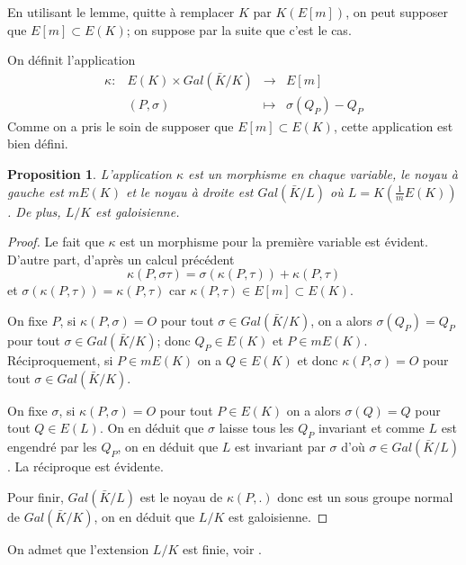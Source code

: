 \documentclass{article}
\newtheorem{proposition}{Proposition}
\begin{document}
En utilisant le lemme, quitte à remplacer $K$ par $K(E[m])$,
on peut supposer que $E[m] \subset E(K)$; on suppose par la suite que c'est le cas.

On définit l'application
\begin{equation*}
\begin{array}{lrcl}
\kappa :&E(K) \times Gal(\bar{K}/K) & \longrightarrow & E[m] \\
	 & (P, \sigma) & \longmapsto & \sigma(Q_{P}) - Q_{P}
\end{array}
\end{equation*}
Comme on a pris le soin de supposer que $E[m] \subset E(K)$, cette application est bien défini.

\begin{proposition}
L'application $\kappa$ est un morphisme en chaque variable, le noyau à gauche est $mE(K)$ et le noyau à droite
est $Gal(\bar{K}/L)$ où $L=K(\frac{1}{m}E(K))$. De plus, $L/K$ est galoisienne.
\end{proposition}

\begin{proof}
Le fait que $\kappa$ est un morphisme pour la première variable est évident. D'autre part,
d'après un calcul précédent
\begin{equation*}
\kappa(P, \sigma \tau) = \sigma(\kappa(P, \tau)) + \kappa(P, \tau)
\end{equation*}
et $\sigma(\kappa(P, \tau)) = \kappa(P, \tau)$ car $\kappa(P, \tau) \in E[m] \subset E(K)$.

On fixe $P$, si $\kappa(P, \sigma) = O$ pour tout $\sigma \in Gal(\bar{K}/K)$, on a alors 
$\sigma(Q_{P}) = Q_{P}$ pour tout $\sigma \in Gal(\bar{K}/K)$; donc $Q_{P}\in E(K)$ et $P \in mE(K)$.
Réciproquement, si $P \in mE(K)$ on a $Q \in E(K)$ et donc $\kappa(P, \sigma) = O$ pour tout 
$\sigma \in Gal(\bar{K}/K)$.

On fixe $\sigma$, si $\kappa(P, \sigma) = O$ pour tout $P \in E(K)$ on a alors $\sigma(Q)=Q$ pour tout $Q\in E(L)$.
On en déduit que $\sigma$ laisse tous les $Q_{P}$ invariant et comme $L$ est engendré par les $Q_{P}$, on 
en déduit que $L$ est invariant par $\sigma$ d'où $\sigma \in Gal(\bar{K}/L)$. La réciproque est évidente.

Pour finir, $Gal(\bar{K}/L)$ est le noyau de $\kappa(P, .)$ donc est un sous groupe normal de $Gal(\bar{K}/K)$,
on en déduit que $L/K$ est galoisienne.
\end{proof}

On admet que l'extension $L/K$ est finie, voir \cite{silverman_arithmetic_2009}.
\end{document}
